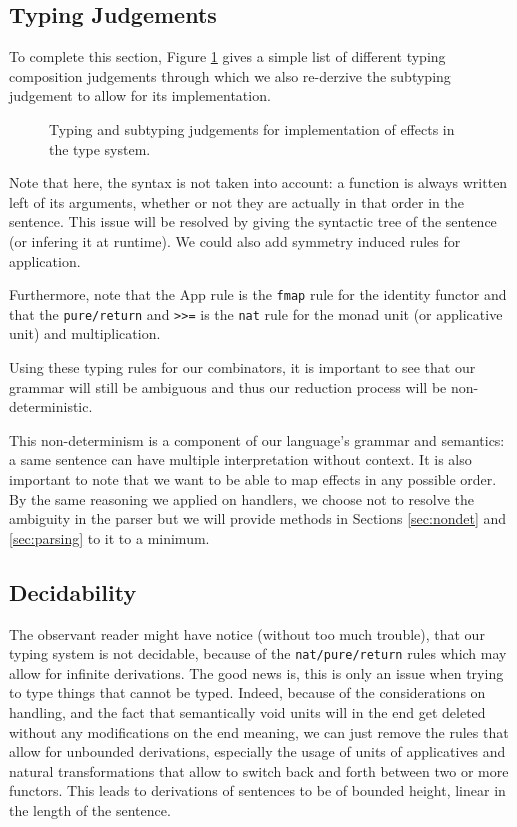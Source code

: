 \subsection{Typing Judgements}\label{subsec:judgements}
To complete this section, Figure \ref{tab:judgements} gives a simple list of different typing composition judgements through which we also re-derzive the subtyping judgement to allow for its implementation.
\begin{figure}
	
	\caption{Typing and subtyping judgements for implementation of effects in the
		type system.}
	\label{tab:judgements}
\end{figure}
Note that here, the syntax is not taken into account: a function is always written left of its arguments, whether or not they are actually in that order in the sentence.
This issue will be resolved by giving the syntactic tree of the sentence (or infering it at runtime).
We could also add symmetry induced rules for application.

Furthermore, note that the App rule is the \texttt{fmap} rule for the identity functor and that the \texttt{pure/return} and \texttt{>>=} is the \texttt{nat} rule for the monad unit (or applicative unit) and multiplication.

\medskip

Using these typing rules for our combinators, it is important to see that our grammar will still be ambiguous and thus our reduction process will be non-deterministic.

This non-determinism is a component of our language's grammar and semantics:
a same sentence can have multiple interpretation without context.
It is also important to note that we want to be able to map effects in any
possible order.
By the same reasoning we applied on handlers, we choose not to resolve the
ambiguity in the parser but we will provide methods in Sections
\ref{sec:nondet} and \ref{sec:parsing} to it to a minimum.

\subsection{Decidability}
The observant reader might have notice (without too much trouble), that our
typing system is not decidable, because of the \texttt{nat/pure/return} rules
which may allow for infinite derivations.
The good news is, this is only an issue when trying to type things that cannot
be typed.
Indeed, because of the considerations on handling, and the fact that
semantically void units will in the end get deleted without any modifications
on the end meaning, we can just remove the rules that allow for unbounded
derivations, especially the usage of units of applicatives and natural
transformations that allow to switch back and forth between two or more
functors.
This leads to derivations of sentences to be of bounded height, linear in the
length of the sentence.
